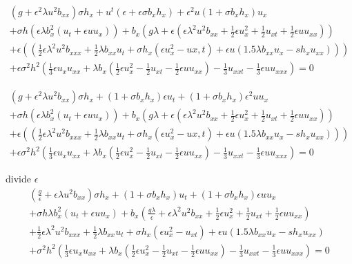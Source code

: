 \documentclass[12pt]{article}
\begin{document}
\begin{multline}
 \left(g + \epsilon^2  \lambda u^2  b_{xx}\right) \sigma h_x + u^{t}(\epsilon + \epsilon \sigma b_x h_x) + \epsilon^2 u (1 + \sigma b_x h_x) u_x 
 \\ +\sigma h (\epsilon \lambda b_x^2 (u_t + \epsilon u u_x))
+ b_x (g \lambda + \epsilon(\epsilon \lambda^2 u^2 b_{xx} + \frac{1}{2}\epsilon u_x^2
 + \frac{1}{2} u_{xt} + \frac{1}{2} \epsilon u u_{xx} ))
 \\
+ \epsilon (( \frac{1}{2} \epsilon \lambda^2 u^2 b_{xxx} + \frac{1}{2} \lambda b_{xx} u_t
+ \sigma h_{x} ( \epsilon u_{x}^2 - u{x,t}) + \epsilon u (1.5 \lambda b_{xx} u_{x} - s h_x u_{xx} ))) 
\\
+ \epsilon \sigma^2 h^2 ( \frac{1}{3} \epsilon u_{x}u_{xx}
+ \lambda b_x ( \frac{1}{2} \epsilon u_x^2 - \frac{1}{2} u_{xt} - \frac{1}{2} \epsilon u u_{xx})
- \frac{1}{3} u_{xxt} - \frac{1}{3} \epsilon u u_{xxx}) = 0
\end{multline}

\begin{multline}
 \left(g + \epsilon^2  \lambda u^2  b_{xx}\right) \sigma h_x + \left(1 + \sigma b_x h_x\right) \epsilon u_{t} +  \left(1 + \sigma b_x h_x \right) \epsilon^2 u u_x
 \\ +\sigma h \left(\epsilon \lambda b_x^2 \left(u_t + \epsilon u u_x \right)\right)
+ b_x \left(g \lambda + \epsilon \left(\epsilon \lambda^2 u^2 b_{xx} + \frac{1}{2}\epsilon u_x^2
 + \frac{1}{2} u_{xt} + \frac{1}{2} \epsilon u u_{xx} \right) \right)
 \\
+ \epsilon \left(\left( \frac{1}{2} \epsilon \lambda^2 u^2 b_{xxx} + \frac{1}{2} \lambda b_{xx} u_t
+ \sigma h_{x} \left( \epsilon u_{x}^2 - u{x,t} \right) + \epsilon u \left(1.5 \lambda b_{xx} u_{x} - s h_x u_{xx} \right)\right)\right) 
\\
+ \epsilon \sigma^2 h^2 \left( \frac{1}{3} \epsilon u_{x}u_{xx}
+ \lambda b_x \left( \frac{1}{2} \epsilon u_x^2 - \frac{1}{2} u_{xt} - \frac{1}{2} \epsilon u u_{xx} \right)
- \frac{1}{3} u_{xxt} - \frac{1}{3} \epsilon u u_{xxx} \right) = 0
\end{multline}

divide $\epsilon$
\begin{multline}
 \left(\frac{g}{\epsilon} + \epsilon  \lambda u^2  b_{xx}\right) \sigma h_x + \left(1 + \sigma b_x h_x\right) u_{t} +  \left(1 + \sigma b_x h_x \right) \epsilon u u_x
 \\ +\sigma h\lambda b_x^2 \left(u_t + \epsilon u u_x \right)
+ b_x \left( \frac{g \lambda}{\epsilon} +  \epsilon \lambda^2 u^2 b_{xx} + \frac{1}{2}\epsilon u_x^2
 + \frac{1}{2} u_{xt} + \frac{1}{2} \epsilon u u_{xx}  \right)
 \\
+  \frac{1}{2} \epsilon \lambda^2 u^2 b_{xxx} + \frac{1}{2} \lambda b_{xx} u_t
+ \sigma h_{x} \left( \epsilon u_{x}^2 - u_{xt} \right) + \epsilon u \left(1.5 \lambda b_{xx} u_{x} - s h_x u_{xx} \right)
\\
+ \sigma^2 h^2 \left( \frac{1}{3} \epsilon u_{x}u_{xx}
+ \lambda b_x \left( \frac{1}{2} \epsilon u_x^2 - \frac{1}{2} u_{xt} - \frac{1}{2} \epsilon u u_{xx} \right)
- \frac{1}{3} u_{xxt} - \frac{1}{3} \epsilon u u_{xxx} \right) = 0
\end{multline}
\end{document}
